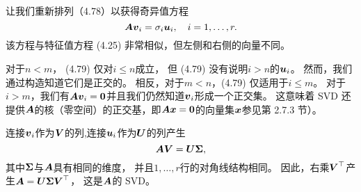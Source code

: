 让我们重新排列（4.78）以获得奇异值方程
\begin{equation}
    \A\v_i = \sigma_i\u_i,\quad i=1,\dots,r.
\end{equation}
该方程与特征值方程 (4.25) 非常相似，但左侧和右侧的向量不同。

对于$n < m$， (4.79) 仅对$i \leqslant n$成立，
但 (4.79) 没有说明$i > n$的$\u_i$。
然而，我们通过构造知道它们是正交的。
相反，对于$m < n$，(4.79) 仅适用于$i \leqslant m$。
对于$i > m$，我们有$\A\v_i = \0$并且我们仍然知道$\v_i$形成一个正交集。
这意味着 SVD 还提供$\A$的核（零空间）的正交基，即$\A\x = \0$的向量集$\x$参见第 2.7.3 节）。

连接$\v_i$作为$\V$的列,连接$\u_i$作为$\U$的列产生
\begin{equation}
    \A\V = \U\bs{\Sigma},
\end{equation}
其中$\bs{\Sigma}$与$\A$具有相同的维度，
并且$1,\dots,r$行的对角线结构相同。
因此，右乘$\V^\top$产生$\A = \U\bs{\Sigma}\V^\top$，
这是$\A$的 SVD。

